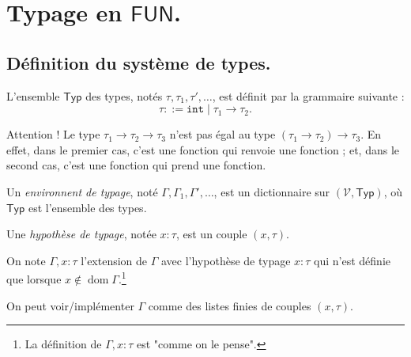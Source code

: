 \documentclass[../main]{subfiles}
\begin{document}
  \chapter{Typage en $\mathsf{FUN}$.} \label{thprog-chap07}
  \minitoc
  \section{Définition du système de types.}

  L'ensemble $\mathsf{Typ}$ des types, notés $\tau, \tau_1, \tau',\ldots$, est définit par la grammaire suivante : \[
  \tau ::= \mathtt{int}  \mid  \tau_1 \to \tau_2
  .\]

  \begin{note}
    Attention ! Le type $\tau_1 \to \tau_2 \to \tau_3$ n'est pas égal au type $(\tau_1 \to \tau_2) \to \tau_3$.
    En effet, dans le premier cas, c'est une fonction qui renvoie une fonction ; et, dans le second cas, c'est une fonction qui prend une fonction.
  \end{note}

  \begin{defn}
    Un \textit{environnent de typage}, noté $\Gamma, \Gamma_1, \Gamma',\ldots$, est un dictionnaire sur $(\mathcal{V}, \mathsf{Typ})$, où $\mathsf{Typ}$ est l'ensemble des types.

    Une \textit{hypothèse de typage}, notée $x:\tau$, est un couple $(x,\tau)$.

    On note $\Gamma, x : \tau$ l'extension de $\Gamma$ avec l'hypothèse de typage $x : \tau$ qui n'est définie que lorsque  $x \not\in \operatorname{dom} \Gamma$.\footnote{La définition de $\Gamma, x : \tau$ est "comme on le pense".}
  \end{defn}

  \begin{rmk}
    On peut voir/implémenter $\Gamma$ comme des listes finies de couples $(x, \tau)$.
  \end{rmk}
\end{document}
